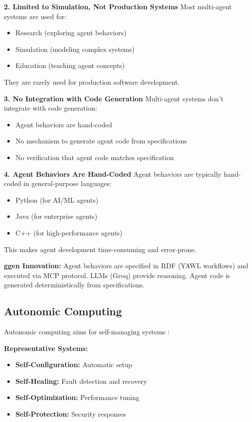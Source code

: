 \textbf{2. Limited to Simulation, Not Production Systems}
Most multi-agent systems are used for:
\begin{itemize}
    \item Research (exploring agent behaviors)
    \item Simulation (modeling complex systems)
    \item Education (teaching agent concepts)
\end{itemize}

They are rarely used for production software development.

\textbf{3. No Integration with Code Generation}
Multi-agent systems don't integrate with code generation:
\begin{itemize}
    \item Agent behaviors are hand-coded
    \item No mechanism to generate agent code from specifications
    \item No verification that agent code matches specification
\end{itemize}

\textbf{4. Agent Behaviors Are Hand-Coded}
Agent behaviors are typically hand-coded in general-purpose languages:
\begin{itemize}
    \item Python (for AI/ML agents)
    \item Java (for enterprise agents)
    \item C++ (for high-performance agents)
\end{itemize}

This makes agent development time-consuming and error-prone.

\textbf{ggen Innovation:} Agent behaviors are specified in RDF (YAWL workflows) and executed via MCP protocol. LLMs (Groq) provide reasoning. Agent code is generated deterministically from specifications.

\subsection{Autonomic Computing}

Autonomic computing aims for self-managing systems \cite{kephart2003autonomic}:

\textbf{Representative Systems:}
\begin{itemize}
    \item \textbf{Self-Configuration:} Automatic setup
    \item \textbf{Self-Healing:} Fault detection and recovery
    \item \textbf{Self-Optimization:} Performance tuning
    \item \textbf{Self-Protection:} Security responses
\end{itemize}

